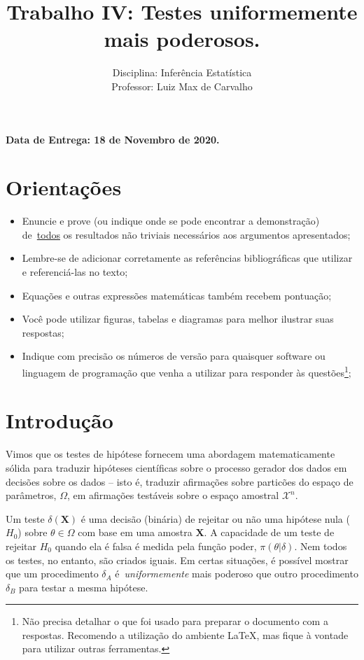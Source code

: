 \documentclass[a4paper,10pt, notitlepage]{report}
\title{Trabalho IV: Testes uniformemente mais poderosos.}
\author{Disciplina: Inferência Estatística \\ Professor: Luiz Max de Carvalho}
\newcommand{\bX}{\boldsymbol{X}} %
\begin{document}
\maketitle

\textbf{Data de Entrega: 18 de Novembro de 2020.}

\section*{Orientações}
\begin{itemize}
 \item Enuncie e prove (ou indique onde se pode encontrar a demonstração) de~\underline{todos} os resultados não triviais necessários aos argumentos apresentados;
 \item Lembre-se de adicionar corretamente as referências bibliográficas que utilizar e referenciá-las no texto;
 \item Equações e outras expressões matemáticas também recebem pontuação;
 \item Você pode utilizar figuras, tabelas e diagramas para melhor ilustrar suas respostas;
 \item Indique com precisão os números de versão para quaisquer software ou linguagem de programação que venha a utilizar para responder às questões\footnote{Não precisa detalhar o que foi usado para preparar o documento com a respostas. Recomendo a utilização do ambiente LaTeX, mas fique à vontade para utilizar outras ferramentas.};
 \end{itemize}


\section*{Introdução}

Vimos que os testes de hipótese fornecem uma abordagem matematicamente sólida para traduzir hipóteses científicas sobre o processo gerador dos dados em decisões sobre os dados -- isto é, traduzir afirmações sobre particões do espaço de parâmetros, $\Omega$, em afirmações testáveis sobre o espaço amostral $\mathcal{X}^n$.

Um teste $\delta(\bX)$ é uma decisão (binária) de rejeitar ou não uma hipótese nula ($H_0$) sobre $\theta \in \Omega$ com base em uma amostra $\bX$.
A capacidade de um teste de rejeitar $H_0$ quando ela é falsa é medida pela função poder, $\pi(\theta |\delta)$.
Nem todos os testes, no entanto, são criados iguais.
Em certas situações, é possível mostrar que um procedimento $\delta_A$ é~\textit{uniformemente} mais poderoso que outro procedimento $\delta_B$ para testar a mesma hipótese.
\end{document}
